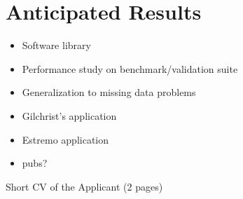 \documentclass{article}
\begin{document}
\section{Anticipated Results}
\begin{itemize}
  \item Software library
  \item Performance study on benchmark/validation suite
  \item Generalization to missing data problems
  \item Gilchrist's application
  \item Estremo application
  \item pubs?
\end{itemize}

Short CV of the Applicant (2 pages) 

{}
 \newpage
\end{document}

